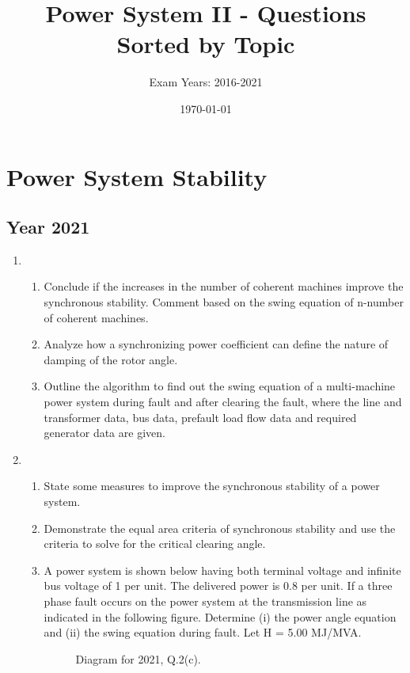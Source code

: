 \documentclass[12pt, a4paper]{article}
\title{Power System II - Questions Sorted by Topic}
\author{Exam Years: 2016-2021}
\date{\today}
\begin{document}
	\maketitle
	\tableofcontents
	\newpage
	
	\section{Power System Stability}
	
	\subsection{Year 2021}
	\begin{enumerate}[label=\textbf{Q\arabic*.}, wide, labelindent=0pt]
		\item 
		\begin{enumerate}[label=\textbf{(\alph*)}]
			\item Conclude if the increases in the number of coherent machines improve the synchronous stability. Comment based on the swing equation of n-number of coherent machines.
			\item Analyze how a synchronizing power coefficient can define the nature of damping of the rotor angle.
			\item Outline the algorithm to find out the swing equation of a multi-machine power system during fault and after clearing the fault, where the line and transformer data, bus data, prefault load flow data and required generator data are given.
		\end{enumerate}
		\item 
		\begin{enumerate}[label=\textbf{(\alph*)}]
			\item State some measures to improve the synchronous stability of a power system.
			\item Demonstrate the equal area criteria of synchronous stability and use the criteria to solve for the critical clearing angle.
			\item A power system is shown below having both terminal voltage and infinite bus voltage of 1 per unit. The delivered power is 0.8 per unit. If a three phase fault occurs on the power system at the transmission line as indicated in the following figure. Determine (i) the power angle equation and (ii) the swing equation during fault. Let H = 5.00 MJ/MVA.
			\begin{figure}[h!]
				\centering
				\caption{Diagram for 2021, Q.2(c).}
			\end{figure}
		\end{enumerate}
	\end{enumerate}
	
\end{document}
